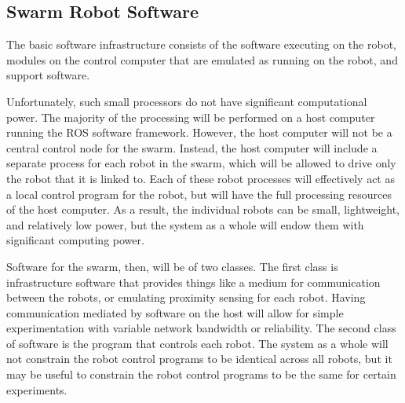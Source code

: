 \documentclass[]{article}
\begin{document}
\subsection{Swarm Robot Software}

The basic software infrastructure consists of the software executing on the robot, modules on the control computer that are emulated as running on the robot, and support software. 

Unfortunately, such small processors do not have significant computational power. 
The majority of the processing will be performed on a host computer running the ROS software framework. 
However, the host computer will not be a central control node for the swarm. 
Instead, the host computer will include a separate process for each robot in the swarm, which will be allowed to drive only the robot that it is linked to. 
Each of these robot processes will effectively act as a local control program for the robot, but will have the full processing resources of the host computer. 
As a result, the individual robots can be small, lightweight, and relatively low power, but the system as a whole will endow them with significant computing power. 

Software for the swarm, then, will be of two classes. 
The first class is infrastructure software that provides things like a medium for communication between the robots, or emulating proximity sensing for each robot. 
Having communication mediated by software on the host will allow for simple experimentation with variable network bandwidth or reliability. 
The second class of software is the program that controls each robot. 
The system as a whole will not constrain the robot control programs to be identical across all robots, but it may be useful to constrain the robot control programs to be the same for certain experiments. 
\end{document}
